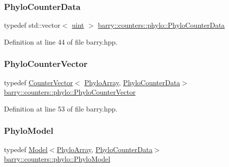 \subsubsection{\texorpdfstring{Phylo\+Counter\+Data}{PhyloCounterData}}
{\footnotesize\ttfamily typedef std\+::vector$<$ \hyperlink{namespacebarry_a11dfc53ddb4672278319aa04f1e09a6c}{uint} $>$ \hyperlink{namespacebarry_1_1counters_1_1phylo_a6ecc0d8ab76f8dc2db152221a8e9e95a}{barry\+::counters\+::phylo\+::\+Phylo\+Counter\+Data}}



Definition at line 44 of file barry.\+hpp.

\mbox{\label{namespacebarry_1_1counters_1_1phylo_a2f117d1cd1dff67e1539cbc0aef5766a}} 
\subsubsection{\texorpdfstring{Phylo\+Counter\+Vector}{PhyloCounterVector}}
{\footnotesize\ttfamily typedef \hyperlink{classbarry_1_1_counter_vector}{Counter\+Vector}$<$ \hyperlink{namespacebarry_1_1counters_1_1phylo_a50a6652c16ff57d76b4099043d6a0bbb}{Phylo\+Array}, \hyperlink{namespacebarry_1_1counters_1_1phylo_a6ecc0d8ab76f8dc2db152221a8e9e95a}{Phylo\+Counter\+Data}$>$ \hyperlink{namespacebarry_1_1counters_1_1phylo_a2f117d1cd1dff67e1539cbc0aef5766a}{barry\+::counters\+::phylo\+::\+Phylo\+Counter\+Vector}}



Definition at line 53 of file barry.\+hpp.

\mbox{\label{namespacebarry_1_1counters_1_1phylo_ad444f866521f3b4fc617c5fffe16b1d8}} 
\subsubsection{\texorpdfstring{Phylo\+Model}{PhyloModel}}
{\footnotesize\ttfamily typedef \hyperlink{classbarry_1_1_model}{Model}$<$\hyperlink{namespacebarry_1_1counters_1_1phylo_a50a6652c16ff57d76b4099043d6a0bbb}{Phylo\+Array}, \hyperlink{namespacebarry_1_1counters_1_1phylo_a6ecc0d8ab76f8dc2db152221a8e9e95a}{Phylo\+Counter\+Data}$>$ \hyperlink{namespacebarry_1_1counters_1_1phylo_ad444f866521f3b4fc617c5fffe16b1d8}{barry\+::counters\+::phylo\+::\+Phylo\+Model}}




